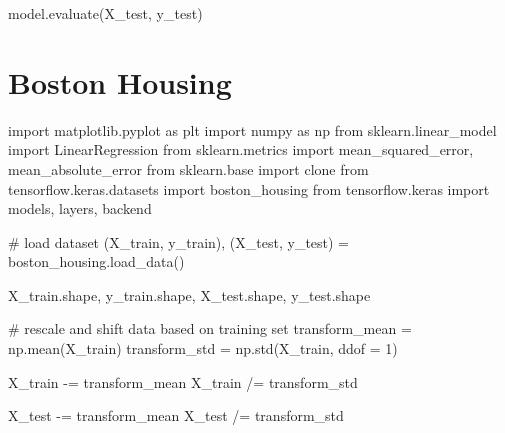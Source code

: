 \documentclass[
  letterpaper,
  DIV=11,
  numbers=noendperiod]{scrreprt}
\newenvironment{Shaded}{\begin{snugshade}}{\end{snugshade}}
\newcommand{\CommentTok}[1]{\textcolor[rgb]{0.37,0.37,0.37}{#1}}
\newcommand{\DecValTok}[1]{\textcolor[rgb]{0.68,0.00,0.00}{#1}}
\newcommand{\ImportTok}[1]{\textcolor[rgb]{0.00,0.46,0.62}{#1}}
\newcommand{\NormalTok}[1]{\textcolor[rgb]{0.00,0.23,0.31}{#1}}
\newcommand{\OperatorTok}[1]{\textcolor[rgb]{0.37,0.37,0.37}{#1}}
\begin{document}
\begin{Shaded}
\begin{Highlighting}[]
\NormalTok{model.evaluate(X\_test, y\_test)}
\end{Highlighting}
\end{Shaded}

\hypertarget{boston-housing}{%
\chapter{Boston Housing}\label{boston-housing}}

\begin{Shaded}
\begin{Highlighting}[]
\ImportTok{import}\NormalTok{ matplotlib.pyplot }\ImportTok{as}\NormalTok{ plt}
\ImportTok{import}\NormalTok{ numpy }\ImportTok{as}\NormalTok{ np}
\ImportTok{from}\NormalTok{ sklearn.linear\_model }\ImportTok{import}\NormalTok{ LinearRegression}
\ImportTok{from}\NormalTok{ sklearn.metrics }\ImportTok{import}\NormalTok{ mean\_squared\_error, mean\_absolute\_error}
\ImportTok{from}\NormalTok{ sklearn.base }\ImportTok{import}\NormalTok{ clone}
\ImportTok{from}\NormalTok{ tensorflow.keras.datasets }\ImportTok{import}\NormalTok{ boston\_housing}
\ImportTok{from}\NormalTok{ tensorflow.keras }\ImportTok{import}\NormalTok{ models, layers, backend}
\end{Highlighting}
\end{Shaded}

\begin{Shaded}
\begin{Highlighting}[]
\CommentTok{\# load dataset}
\NormalTok{(X\_train, y\_train), (X\_test, y\_test) }\OperatorTok{=}\NormalTok{ boston\_housing.load\_data()}

\NormalTok{X\_train.shape, y\_train.shape, X\_test.shape, y\_test.shape}
\end{Highlighting}
\end{Shaded}

\begin{Shaded}
\begin{Highlighting}[]
\CommentTok{\# rescale and shift data based on training set}
\NormalTok{transform\_mean }\OperatorTok{=}\NormalTok{ np.mean(X\_train)}
\NormalTok{transform\_std  }\OperatorTok{=}\NormalTok{ np.std(X\_train, ddof }\OperatorTok{=} \DecValTok{1}\NormalTok{)}

\NormalTok{X\_train }\OperatorTok{{-}=}\NormalTok{ transform\_mean}
\NormalTok{X\_train }\OperatorTok{/=}\NormalTok{ transform\_std}

\NormalTok{X\_test }\OperatorTok{{-}=}\NormalTok{ transform\_mean}
\NormalTok{X\_test }\OperatorTok{/=}\NormalTok{ transform\_std}
\end{Highlighting}
\end{Shaded}
\end{document}
